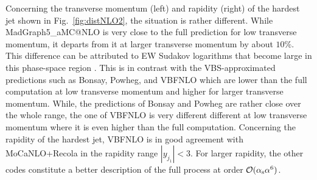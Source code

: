 Concerning the transverse momentum (left) and rapidity (right) of the hardest jet shown in Fig.~\ref{fig:distNLO2}, the situation is rather different.
While {\sc MadGraph5\_aMC\-@NLO} is very close to the full prediction for low transverse momentum, it departs from it 
at larger transverse momentum by about $10\%$.
This difference can be attributed to EW Sudakov logarithms that become large in this phase-space region .
This is in contrast with the VBS-approximated predictions such as {\sc Bonsay}, {\sc Powheg}, and {\sc VBFNLO} which are lower than the full computation at low transverse momentum and higher for larger transverse momentum.
While, the predictions of {\sc Bonsay} and {\sc Powheg} are rather close over the whole range, the one of {\sc VBFNLO} is very different different at low transverse momentum where it is even higher than the full computation.
Concerning the rapidity of the hardest jet, {\sc VBFNLO} is in good agreement with {\sc MoCaNLO}+{\sc Recola} in the rapidity range $|y_{j_1}| < 3$.
For larger rapidity, the other codes constitute a better description of the full process at order $\mathcal{O}(\alpha_{\rm s}\alpha^6)$.

